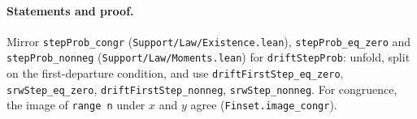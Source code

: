 \paragraph{Statements and proof.} Mirror \texttt{stepProb\_congr} (\texttt{Support/Law/Existence.lean}),
\texttt{stepProb\_eq\_zero} and \texttt{stepProb\_nonneg} (\texttt{Support/Law/Moments.lean}) for
\texttt{driftStepProb}: unfold, split on the first-departure condition, and use
\texttt{driftFirstStep\_eq\_zero}, \texttt{srwStep\_eq\_zero}, \texttt{driftFirstStep\_nonneg},
\texttt{srwStep\_nonneg}. For congruence, the image of \texttt{range n} under $x$ and $y$ agree
(\texttt{Finset.image\_congr}).
